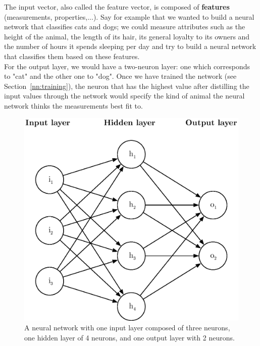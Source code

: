 The input vector, also called the feature vector, 
is composed of \textbf{features} (measurements, properties,...). Say
for example that we wanted to build a neural network that classifies cats and
dogs; we could measure attributes such as the height of the animal, the length
of its hair, its general loyalty to its owners and the number of hours it 
spends sleeping per day and try to build a neural network that classifies
them based on these features.\\

For the output layer, we would have a two-neuron layer: one which corresponds
to "cat" and the other one to "dog". Once we have trained the network
(see Section~\ref{nn:training}), the neuron that has the highest value
after distilling the input values through the network would specify the
kind of animal the neural network thinks the measurements best fit to.\\

\begin{figure}[H]
	\centering
	\includegraphics[width=0.6\linewidth]{fig/neural_network.eps}
	\caption{A neural network with one input layer composed of three neurons,
	one hidden layer of 4 neurons, and one output layer with 2 neurons.}
	\label{fig:neural_network}
\end{figure}


